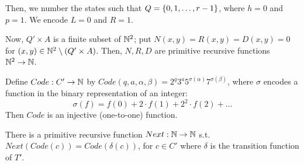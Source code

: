 Then, we number the states such that $ Q = \left\lbrace 0, 1, \dots, r - 1 \right\rbrace $, where $ h = 0 $ and $ p = 1 $. We encode $ L = 0 $ and $ R = 1 $.

Now, $ Q' \times A $ is a finite subset of $ \mathbb{N}^2 $; put $ N(x, y) = R(x, y) = D(x, y) = 0 $ for $ (x, y) \in \mathbb{N}^2 \setminus (Q' \times A) $. Then, $ N, R, D $ are primitive recursive functions $ \mathbb{N}^2 \to \mathbb{N} $.

Define $ Code: C' \to \mathbb{N} $ by $ Code(q, a, \alpha, \beta) = 2^q 3^a 5^{\sigma(\alpha)} 7^{\sigma(\beta)} $, where $ \sigma $ encodes a function in the binary representation of an integer:
\begin{equation*}
\sigma(f) = f(0) + 2 \cdot f(1) + 2^2 \cdot f(2) + \dots
\end{equation*}
Then $ Code $ is an injective (one-to-one) function.

There is a primitive recursive function $ Next: \mathbb{N} \to \mathbb{N} $ s.t. $ Next(Code(c)) = Code(\delta(c)) $, for $ c \in C' $ where $ \delta $ is the transition function of $ T' $.

